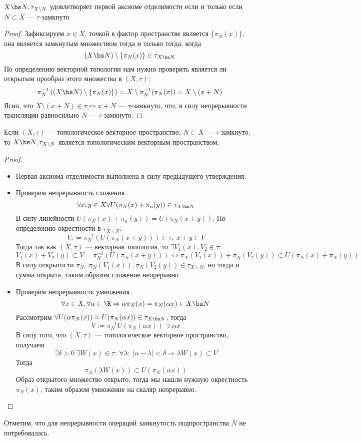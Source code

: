 \begin{claim}
	$X \bs N , \tau_{X \backslash N}$ удовлетворяет первой аксиоме отделимости если и только если $N \subset X$ --- $\tau$-замкнуто 
\end{claim}
\begin{proof}
	Зафиксируем $x \in X$, точкой в фактор пространстве является $\{\pi_N(x)\}$, она является замкнутым множеством тогда и только тогда, когда
	$$
	(X\bs N) \setminus \{\pi_N(x)\} \in \tau_{X \bs N}
	$$
	По определению векторной топологии нам нужно проверить является ли открытым прообраз этого множества в $(X, \tau)$:
	$$
	\pi_N^{-1}\left((X\bs N) \setminus \{\pi_N(x)\}\right) = X \setminus \pi_N^{-1}(\pi_N(x)) = X \setminus (x + N)
	$$
	Ясно, что $X \setminus (x + N) \in \tau \Leftrightarrow x + N$ --- $\tau$-замкнуто, что, в силу непрерывности трансляции равносильно $N$ --- $\tau$-замкнуто.
\end{proof}
\begin{claim}
	Если $(X, \tau)$ --- топологическое векторное пространство, $N \subset X$ --- $\tau$-замкнуто, то $X \bs N , \tau_{X \backslash N}$ является топологическим векторным пространством.
\end{claim}
\begin{proof}
	\begin{itemize}
	\item Первая аксиома отделимости выполнена в силу предыдущего утверждения.
	\item  Проверим непрерывность сложения.$$
	\forall x,y \in X \forall U(\pi_N(x) + \pi_n(y)) \in \tau_{X \bs N}
	$$
	В силу линейности $U(\pi_N(x) + \pi_n(y)) = U(\pi_N(x+y))$. По определению окрестности в $\tau_{X \backslash N}$:
	$$
	V : = \pi_N^{-1}(U(\pi_N(x+y))) \in \tau, \ x + y \in V
	$$ 
	Тогда так как $(X,\tau)$ --- векторная топология, то $\exists V_1(x), V_2 \in \tau$: 
	$$
	V_1(x) + V_2(y) \subset V = \pi_N^{-1}(U(\pi_N(x+y))) \Leftrightarrow \pi_N(V_1(x)) + \pi_N(V_2(y))\subset U(\pi_N(x) + \pi_N(y))
	$$
	В силу открытости $\pi_N$, $\pi_N(V_1(x)), \pi_N(V_2(y)) \in \tau_{X \backslash N}$, но тогда и сумма открыта, таким образом сложение непрерывно.
	\item Проверим непрерывность умножения. 
	$$
	\forall x \in X, \forall \alpha \in \R \Rightarrow \alpha \pi_N(x) = \pi_N(\alpha x) \in X \bs N
	$$
	Рассмотрим $\forall U(\alpha \pi_N(x)) = U( \pi_N(\alpha x)) \in \tau_{X \bs N}$, тогда
	$$
	V := \pi_N^{-1} U( \pi_N(\alpha x))  \ni \alpha x
	$$
	В силу того, что $(X, \tau)$ --- топологическое векторное пространство, получаем 
	$$
	\exists \delta > 0 \ \exists W(x) \in \tau: \ \forall \lambda: \ |\alpha - \lambda| < \delta \Rightarrow \lambda W(x) \subset V
	$$
	Тогда 
	$$
	\pi_N(\lambda W(x)) \subset U(\pi_N(\alpha x))
	$$
	Образ открытого множество открыто, тогда мы нашли нужную окрестность $\pi_N(x)$, таким образом умножение на скаляр непрерывно.
	\end{itemize}
\end{proof}
\begin{remark}
	Отметим, что для непрерывности операций замкнутость подпространства $N$ не потребовалась.
\end{remark}

